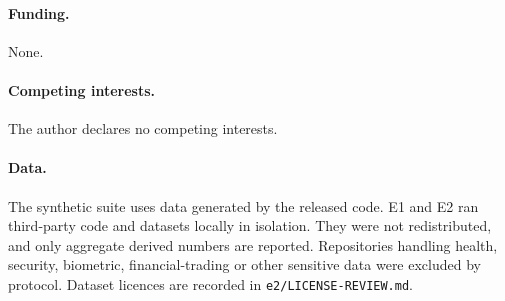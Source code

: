 \documentclass[11pt]{article}
\begin{document}
\paragraph{Funding.} None.
\paragraph{Competing interests.} The author declares no competing interests.
\paragraph{Data.} The synthetic suite uses data generated by the released code. E1 and E2 ran third-party code and datasets locally in isolation. They were not redistributed, and only aggregate derived numbers are reported. Repositories handling health, security, biometric, financial-trading or other sensitive data were excluded by protocol. Dataset licences are recorded in \texttt{e2/LICENSE-REVIEW.md}.



\end{document}
